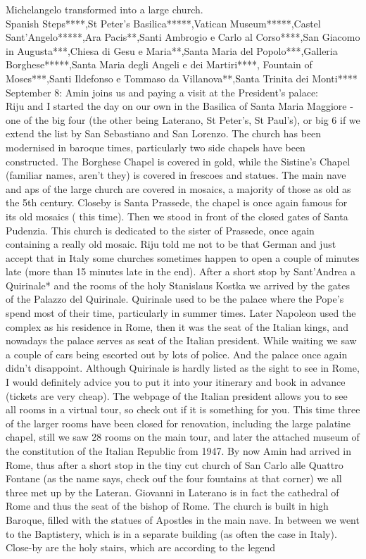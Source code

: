 Michelangelo transformed into a large church.\\

Spanish Steps****,St Peter's Basilica*****,Vatican Museum*****,Castel Sant'Angelo*****,Ara Pacis**,Santi Ambrogio e Carlo al Corso****,San Giacomo in Augusta***,Chiesa di Gesu e Maria**,Santa Maria del Popolo***,Galleria Borghese*****,Santa Maria degli Angeli e dei Martiri****, Fountain of Moses***,Santi Ildefonso e Tommaso da Villanova**,Santa Trinita dei Monti****\\

September 8: Amin joins us and paying a visit at the President's palace:\\
Riju and I started the day on our own in the Basilica of Santa Maria Maggiore - one of the big four (the other being Laterano, St Peter's, St Paul's), or big 6 if we extend the list by San Sebastiano and San Lorenzo. The church has been modernised in baroque times, particularly two side chapels have been constructed. The Borghese Chapel is covered in gold, while the Sistine's Chapel (familiar names, aren't they) is covered in frescoes and statues. The main nave and aps of the large church are covered in mosaics, a majority of those as old as the 5th century. Closeby is Santa Prassede, the chapel is once again famous for its old mosaics ( this time). Then we stood in front of the closed gates of Santa Pudenzia. This church is dedicated to the sister of Prassede, once again containing a really old mosaic. Riju told me not to be that German and just accept that in Italy some churches sometimes happen to open a couple of minutes late (more than 15 minutes late in the end). After a short stop by Sant'Andrea a Quirinale* and the rooms of the holy Stanislaus Kostka we arrived by the gates of the Palazzo del Quirinale. Quirinale used to be the palace where the Pope's spend most of their time, particularly in summer times. Later Napoleon used the complex as his residence in Rome, then it was the seat of the Italian kings, and nowadays the palace serves as seat of the Italian president. While waiting we saw a couple of cars being escorted out by lots of police. And the palace once again didn't disappoint. Although Quirinale is hardly listed as the sight to see in Rome, I would definitely advice you to put it into your itinerary and book in advance (tickets are very cheap). The webpage of the Italian president allows you to see all rooms in a virtual tour, so check out if it is something for you. This time three of the larger rooms have been closed for renovation, including the large palatine chapel, still we saw 28 rooms on the main tour, and later the attached museum of the constitution of the Italian Republic from 1947. By now Amin had arrived in Rome, thus after a short stop in the tiny cut church of San Carlo alle Quattro Fontane (as the name says, check ouf the four fountains at that corner) we all three met up by the Lateran. Giovanni in Laterano is in fact the cathedral of Rome and thus the seat of the bishop of Rome. The church is built in high Baroque, filled with the statues of Apostles in the main nave. In between we went to the Baptistery, which is in a separate building (as often the case in Italy). Close-by are the holy stairs, which are according to the legend 